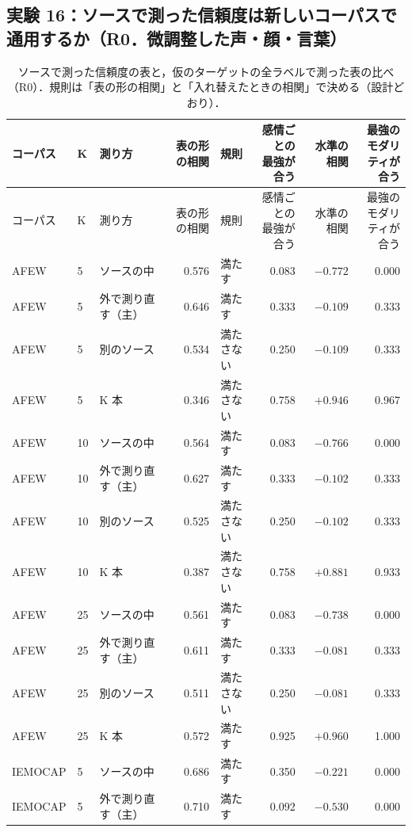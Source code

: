 \subsection*{実験 16：ソースで測った信頼度は新しいコーパスで通用するか（R0．微調整した声・顔・言葉）}
\begin{longtable}{llp{3.0cm}rlrrr}
\caption{ソースで測った信頼度の表と，仮のターゲットの全ラベルで測った表の比べ（R0）．規則は「表の形の相関」と「入れ替えたときの相関」で決める（設計どおり）．}\\
\toprule
コーパス & K & 測り方 & 表の形の相関 & 規則 & \shortstack{感情ごとの\\最強が合う} & 水準の相関 & \shortstack{最強のモダリ\\ティが合う} \\
\midrule
\endfirsthead
\toprule
コーパス & K & 測り方 & 表の形の相関 & 規則 & \shortstack{感情ごとの\\最強が合う} & 水準の相関 & \shortstack{最強のモダリ\\ティが合う} \\
\midrule
\endhead
\bottomrule
\endfoot
AFEW & 5 & ソースの中 & 0.576 & 満たす & 0.083 & $-0.772$ & 0.000 \\
AFEW & 5 & 外で測り直す（主） & 0.646 & 満たす & 0.333 & $-0.109$ & 0.333 \\
AFEW & 5 & 別のソース & 0.534 & 満たさない & 0.250 & $-0.109$ & 0.333 \\
AFEW & 5 & K 本 & 0.346 & 満たさない & 0.758 & $+0.946$ & 0.967 \\
AFEW & 10 & ソースの中 & 0.564 & 満たす & 0.083 & $-0.766$ & 0.000 \\
AFEW & 10 & 外で測り直す（主） & 0.627 & 満たす & 0.333 & $-0.102$ & 0.333 \\
AFEW & 10 & 別のソース & 0.525 & 満たさない & 0.250 & $-0.102$ & 0.333 \\
AFEW & 10 & K 本 & 0.387 & 満たさない & 0.758 & $+0.881$ & 0.933 \\
AFEW & 25 & ソースの中 & 0.561 & 満たす & 0.083 & $-0.738$ & 0.000 \\
AFEW & 25 & 外で測り直す（主） & 0.611 & 満たす & 0.333 & $-0.081$ & 0.333 \\
AFEW & 25 & 別のソース & 0.511 & 満たさない & 0.250 & $-0.081$ & 0.333 \\
AFEW & 25 & K 本 & 0.572 & 満たす & 0.925 & $+0.960$ & 1.000 \\
\midrule
IEMOCAP & 5 & ソースの中 & 0.686 & 満たす & 0.350 & $-0.221$ & 0.000 \\
IEMOCAP & 5 & 外で測り直す（主） & 0.710 & 満たす & 0.092 & $-0.530$ & 0.000 \\

\end{longtable}
